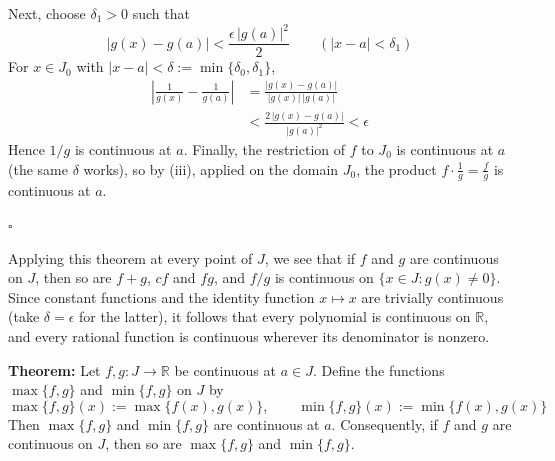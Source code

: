 \documentclass[a4paper,11pt,abstracton]{scrartcl}
\newcommand{\RR}{\mathbb{R}}
\theoremstyle{dotlessP}
\theoremstyle{dotlessS}
\theoremstyle{remark}
\theoremstyle{definition}
\begin{document}
\begin{claim_box}
\begin{enumerate}[(i)]
    Next, choose $\delta_1>0$ such that
    \[
        |g(x)-g(a)|<\frac{\epsilon\,|g(a)|^2}2\qquad(|x-a|<\delta_1)
    \]
    For $x\in J_0$ with $|x-a|<\delta:=\min\{\delta_0,\delta_1\}$,
    \[
    \begin{aligned}
        \left|\frac1{g(x)}-\frac1{g(a)}\right|
        &=\frac{|g(x)-g(a)|}{|g(x)|\,|g(a)|}\\
        &<\frac{2\,|g(x)-g(a)|}{|g(a)|^2}
        <\epsilon
    \end{aligned}
    \]
    Hence $1/g$ is continuous at $a$. Finally, the restriction of $f$ to $J_0$ is continuous at $a$ (the same $\delta$ works), so by (iii), applied on the domain $J_0$, the product $f\cdot\frac1g=\frac fg$ is continuous at $a$.
\end{enumerate}
\hfill$\square$
\end{claim_box}

Applying this theorem at every point of $J$, we see that if $f$ and $g$ are continuous on $J$, then so are $f+g$, $cf$ and $fg$, and $f/g$ is continuous on $\{x\in J:g(x)\ne0\}$. Since constant functions and the identity function $x\mapsto x$ are trivially continuous (take $\delta=\epsilon$ for the latter), it follows that every polynomial is continuous on $\RR$, and every rational function is continuous wherever its denominator is nonzero.

\begin{problem_box}
\textbf{Theorem:}
Let $f,g:J\rightarrow\RR$ be continuous at $a\in J$. Define the functions $\max\{f,g\}$ and $\min\{f,g\}$ on $J$ by
\[
    \max\{f,g\}(x):=\max\{f(x),g(x)\},
    \qquad
    \min\{f,g\}(x):=\min\{f(x),g(x)\}
\]
Then $\max\{f,g\}$ and $\min\{f,g\}$ are continuous at $a$. Consequently, if $f$ and $g$ are continuous on $J$, then so are $\max\{f,g\}$ and $\min\{f,g\}$.
\end{problem_box}
\end{document}
